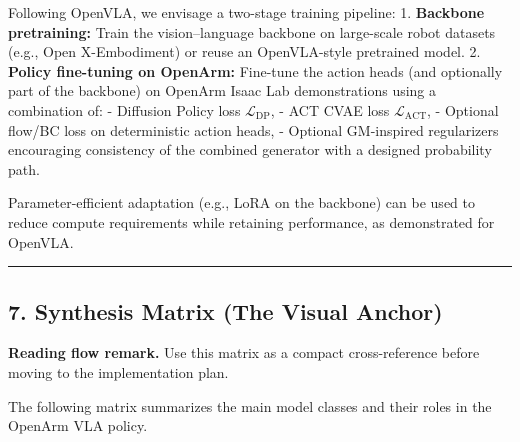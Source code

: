 \documentclass[
]{article}
\theoremstyle{remark}
\begin{document}
Following OpenVLA, we envisage a two-stage training
pipeline: \cite{openvla-notes} 1. \textbf{Backbone pretraining:} Train the
vision--language backbone on large-scale robot datasets (e.g., Open
X-Embodiment) or reuse an OpenVLA-style pretrained model. \cite{openvla-notes} 2.
\textbf{Policy fine-tuning on OpenArm:} Fine-tune the action heads (and
optionally part of the backbone) on OpenArm Isaac Lab demonstrations
using a combination of: - Diffusion Policy loss
\(\mathcal{L}_{\text{DP}}\), - ACT CVAE loss
\(\mathcal{L}_{\text{ACT}}\), - Optional flow/BC loss on deterministic
action heads, - Optional GM-inspired regularizers encouraging
consistency of the combined generator with a designed probability
path. \cite{act-openarm-notes,diffpolicy-theory-notes,gm2025,openvla-notes}

Parameter-efficient adaptation (e.g., LoRA on the backbone) can be used
to reduce compute requirements while retaining performance, as
demonstrated for OpenVLA. \cite{openvla-notes}

\begin{center}\rule{0.5\linewidth}{0.5pt}\end{center}

\subsection{7. Synthesis Matrix (The Visual
Anchor)}\label{synthesis-matrix-the-visual-anchor}

\textbf{Reading flow remark.} Use this matrix as a compact cross-reference before moving to the implementation plan.

The following matrix summarizes the main model classes and their roles
in the OpenArm VLA policy.
\end{document}
